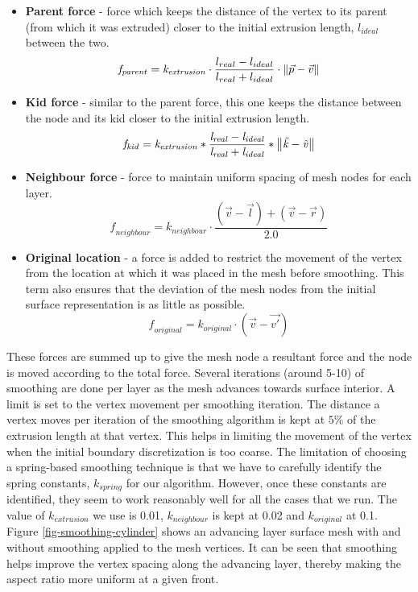 \begin{itemize}
\item \textbf{Parent force} - force which keeps the distance of the vertex to its parent (from which it was extruded) closer to the initial extrusion length, $\mathit{l_{ideal}}$ between the two.
\begin{equation}
\mathit{f_{parent}} = \mathit{k_{extrusion}} \cdot \frac{l_{real} - l_{ideal}}{l_{real} + l_{ideal}} \cdot \left\lVert \vec{p} - \vec{v}\right\rVert
\end{equation}
\item \textbf{Kid force} - similar to the parent force, this one keeps the distance between the node and its kid closer to the initial extrusion length.
\begin{equation}
\mathit{f_{kid} = k_{extrusion} * \frac{l_{real} - l_{ideal}}{l_{real} + l_{ideal}} * \left\lVert\vec{k} - \vec{v}\right\rVert}
\end{equation}
\item \textbf{Neighbour force} - force to maintain uniform spacing of mesh nodes for each layer.
\begin{equation}
\mathit{f_{neighbour} = k_{neighbour} \cdot \frac{(\vec{v} - \vec{l}) + (\vec{v}- \vec{r})}{ 2.0}}
\end{equation}
\item \textbf{Original location} - a force is added to restrict the movement of the vertex from the location at which it was placed in the mesh before smoothing. This term also ensures that the deviation of the mesh nodes from the initial surface representation is as little as possible.
\begin{equation}
\mathit{f_{original} = k_{original} \cdot (\vec{v}- \vec{v'})}
\end{equation}
\end{itemize}

These forces are summed up to give the mesh node a resultant force and the node is moved according to the total force. Several iterations (around 5-10) of smoothing are done per layer as the mesh advances towards surface interior. A limit is set to the vertex movement per smoothing iteration. The distance a vertex moves per iteration of the smoothing algorithm is kept at $5\%$ of the extrusion length at that vertex. This helps in limiting the movement of the vertex when the initial boundary discretization is too coarse. The limitation of choosing a spring-based smoothing technique is that we have to carefully identify the spring constants, $\mathit{k_{spring}}$ for our algorithm. However, once these constants are identified, they seem to work reasonably well for all the cases that we run. The value of $\mathit{k_{extrusion}}$ we use is 0.01, $k_{neighbour}$ is kept at 0.02 and $\mathit{k_{original}}$ at 0.1. Figure \ref{fig-smoothing-cylinder} shows an advancing layer surface mesh with and without smoothing applied to the mesh vertices. It can be seen that smoothing helps improve the vertex spacing along the advancing layer, thereby making the aspect ratio more uniform at a given front.

